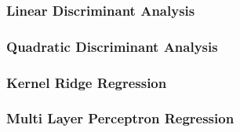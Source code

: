 \subsubsection{Linear Discriminant Analysis}%
\label{ssub:linear-discriminant-analysis}

\subsubsection{Quadratic Discriminant Analysis}%
\label{ssub:quadratic-discriminant-analysis}

\subsubsection{Kernel Ridge Regression}%
\label{ssub:kernel-ridge-regression}

\subsubsection{Multi Layer Perceptron Regression}%
\label{ssub:multi-layer-perceptron-regression}
